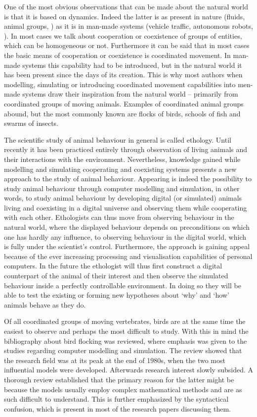 \begin{Abstract}

One of the most obvious observations that can be made about the natural world is that it is based on dynamics. Indeed the latter is as present in nature (fluids, animal groups, \etc) as it is in man-made systems (vehicle traffic, autonomous robots, \etc). In most cases we talk about cooperation or coexistence of groups of entities, which can be homogeneous or not. Furthermore it can be said that in most cases the basic means of cooperation or coexistence is coordinated movement. In man-made systems this capability had to be introduced, but in the natural world it has been present since the days of its creation. This is why most authors when modelling, simulating or introducing coordinated movement capabilities into men-made systems draw their inspiration from the natural world -- primarily from coordinated groups of moving animals. Examples of coordinated animal groups abound, but the most commonly known are flocks of birds, schools of fish and swarms of insects.

The scientific study of animal behaviour in general is called ethology. Until recently it has been practiced entirely through observation of living animals and their interactions with the environment. Nevertheless, knowledge gained while modelling and simulating cooperating and coexisting systems presents a new approach to the study of animal behaviour. Appearing is indeed the possibility to study animal behaviour through computer modelling and simulation, in other words, to study animal behaviour by developing digital (or simulated) animals living and coexisting in a digital universe and observing them while cooperating with each other. Ethologists can thus move from observing behaviour in the natural world, where the displayed behaviour depends on preconditions on which one has hardly any influence, to observing behaviour in the digital world, which is fully under the scientist's control. Furthermore, the approach is gaining appeal because of the ever increasing processing and visualisation capabilities of personal computers. In the future the ethologist will thus first construct a digital counterpart of the animal of their interest and then observe the simulated behaviour inside a perfectly controllable environment. In doing so they will be able to test the existing or forming new hypotheses about `why' and `how' animals behave as they do.

Of all coordinated groups of moving vertebrates, birds are at the same time the easiest to observe and perhaps the most difficult to study. With this in mind the bibliography about bird flocking was reviewed, where emphasis was given to the studies regarding computer modelling and simulation. The review showed that the research field was at its peak at the end of 1980s, when the two most influential models were developed. Afterwards research interest slowly subsided. A thorough review established that the primary reason for the latter might be because the models usually employ complex mathematical methods and are as such difficult to understand. This is further emphasized by the syntactical confusion, which is present in most of the research papers discussing them. 


\end{Abstract}
